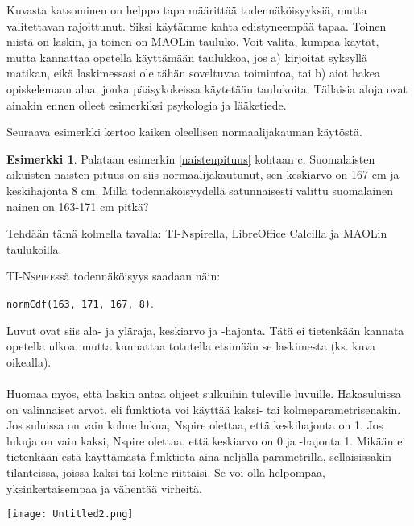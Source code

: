 \documentclass[12pt,leqno,a4paper,oneside]{amsart}
\theoremstyle{definition}
\newtheorem{example}[proclaim]{Esimerkki}
\theoremstyle{remark}
\numberwithin{equation}{section}
\begin{document}
Kuvasta katsominen on helppo tapa määrittää todennäköisyyksiä, mutta valitettavan rajoittunut. Siksi käytämme kahta edistyneempää tapaa. Toinen
niistä on laskin, ja toinen on MAOLin tauluko. Voit valita, kumpaa käytät, mutta kannattaa opetella käyttämään taulukkoa, jos a) kirjoitat
syksyllä matikan, eikä laskimessasi ole tähän soveltuvaa toimintoa, tai b) aiot hakea opiskelemaan alaa, jonka pääsykokeissa käytetään taulukoita.
Tällaisia aloja ovat ainakin ennen olleet esi\-merkiksi psykologia ja lääketiede. 

Seuraava esimerkki kertoo kaiken oleellisen normaalijakauman käytöstä.

\begin{example}
 Palataan esimerkin \ref{naistenpituus} kohtaan c. Suomalaisten aikuisten naisten pituus on siis normaalijakautunut, sen keskiarvo on 167 cm ja
 keskihajonta 8 cm. Millä todennäköisyydellä satunnaisesti valittu suomalainen nainen on 163-171 cm pitkä?
 
 Tehdään tämä kolmella tavalla: TI-Nspirella, LibreOffice Calcilla ja MAOLin taulukoilla. 
 
 \begin{minipage}{0.6\textwidth}
 \textsc{TI-Nspire}ssä todennäköisyys saadaan näin:
 \begin{center}
  \texttt{normCdf(163, 171, 167, 8)}. 
 \end{center}
 Luvut ovat siis ala- ja yläraja, keskiarvo ja -hajonta. Tätä ei tietenkään kannata opetella ulkoa, 
 mutta kannattaa totutella etsimään se laskimesta (ks. kuva oikealla). 
\\\hspace{10pt}\\
 Huomaa myös, että laskin antaa
 ohjeet sulkuihin tuleville luvuille. Hakasuluissa on valinnaiset arvot, eli funktiota voi käyttää
 kaksi- tai kolmeparametrisenakin. Jos suluissa on vain kolme lukua, Nspire olettaa, että keskihajonta on 1.
 Jos lukuja on vain kaksi, Nspire olettaa, että keskiarvo on 0 ja -hajonta 1. Mikään ei tietenkään estä
 käyttämästä funktiota aina neljällä parametrilla, sellaisissakin tilanteissa, joissa kaksi tai kolme riittäisi. 
 Se voi olla helpompaa, yksinkertaisempaa ja vähentää virheitä.
 \end{minipage}
 \hfill
\begin{minipage}{.35\textwidth}
 \begin{center}
  \texttt{[image: Untitled2.png]}
 \end{center}
\end{minipage}
 

\end{example}
\end{document}
